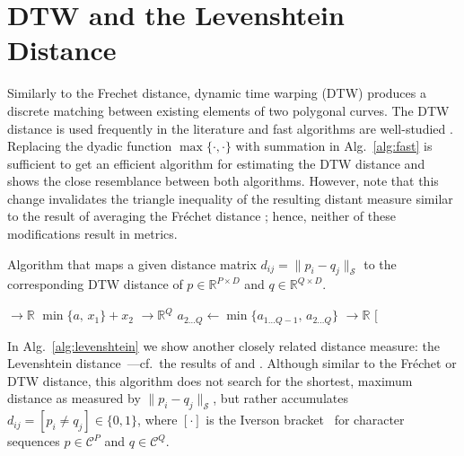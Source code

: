 \clearpage

\section{DTW and the Levenshtein Distance}
\label{sec:dtw_levenshtein}
Similarly to the Frechet distance, dynamic time warping (DTW) produces a discrete matching between existing elements of two polygonal curves.
The DTW distance is used frequently in the literature and fast algorithms are well-studied \citep{salvador07,praetzlich16,silva16,herrmann21}.
Replacing the dyadic function $\max\{ \cdot, \cdot \}$ with summation in Alg.~\ref{alg:fast} is sufficient to get an efficient algorithm for estimating the DTW distance and shows the close resemblance between both algorithms.
However, note that this change invalidates the triangle inequality of the resulting distant measure similar to the result of averaging the Fr\'echet distance \citep{brakatsoulas05}; hence, neither of these modifications result in metrics.
\begin{algorithm}
    \caption{Algorithm that maps a given distance matrix $d_{ij} = \| p_i - q_j \|_\mathcal{S}$ to the corresponding DTW distance of $p \in \mathbb{R}^{P \times D}$ and $q \in \mathbb{R}^{Q \times D}$.}
    \begin{algorithmic}[1]
         $\to \mathbb{R}$
            \State \Return $\min\{ a,\, x_1 \} + x_2$
        \EndFunction
        \Statex
         $\to \mathbb{R}^Q$
            \State $a_{2 \ldots Q} \gets \min\{ a_{1 \ldots Q-1},\, a_{2 \ldots Q} \}$
            \State \Return {}
        \EndFunction
        \Statex
         $\to \mathbb{R}$
            \State \Return $[$
        \EndFunction
    \end{algorithmic}
\end{algorithm}

In Alg.~\ref{alg:levenshtein} we show another closely related distance measure: the Levenshtein distance~\cite{levenshtein65}---cf.~the results of \citet{wagner74} and \citet{hirschberg75}.
Although similar to the Fr\'echet or DTW distance, this algorithm does not search for the shortest, maximum distance as measured by $\| p_i - q_j \|_\mathcal{S}$, but rather accumulates $d_{ij} = [p_i \neq q_j] 
\in \{ 0, 1 \}$, where $[ \cdot ]$ is the Iverson bracket~\citep{knuth92} for character sequences $p \in \mathcal{C}^P$ and $q \in \mathcal{C}^Q$.

